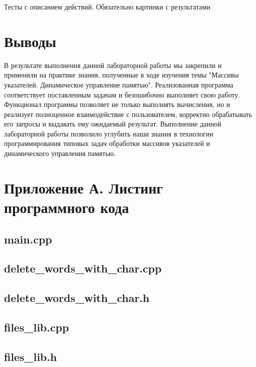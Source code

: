 \documentclass[12pt,a4paper]{article}  %
\begin{document}
	Тесты с описанием действий.
	Обязательно картинки с результатами
	
	\section*{Выводы}

	В результате выполнения данной лабораторной работы мы закрепили и применили на практике знания,
	полученные в ходе изучения темы
	"Массивы указателей.
	Динамическое управление памятью".
	Реализованная программа соответствует поставленным задачам и безошибочно выполняет свою работу.
	Функционал программы позволяет не только выполнять вычисления, но и реализует полноценное взаимодействие
	с пользователем, корректно обрабатывать его запросы и выдавать ему
	ожидаемый результат.
	Выполнение данной лабораторной работы позволило углубить наши знания в технологии программирования типовых
	задач обработки массивов указателей и динамического управления памятью.
	
	\newpage
	\section*{Приложение А. Листинг программного кода}

	\subsection*{main.cpp}
	
	
	\newpage
	\subsection*{delete\_words\_with\_char.cpp}
	
	
	\newpage
	\subsection*{delete\_words\_with\_char.h}
	
	
	\newpage
	\subsection*{files\_lib.cpp}
	
	
	\newpage
	\subsection*{files\_lib.h}
	
	
\end{document}
